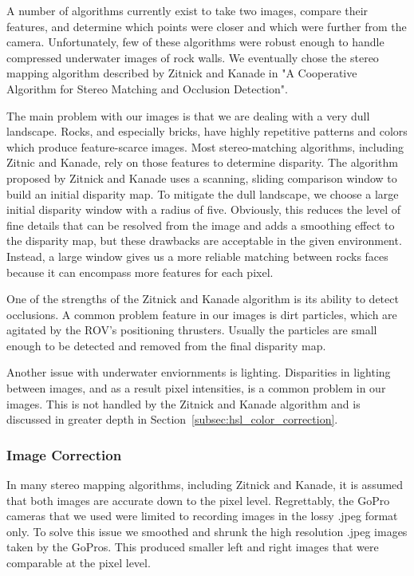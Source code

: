 \documentclass[a4paper,twoside]{article}
\begin{document}
A number of algorithms currently exist to take two images, compare their features, and determine which points were closer and which were further from the camera. 
Unfortunately, few of these algorithms were robust enough to handle compressed underwater images of rock walls.
We eventually chose the stereo mapping algorithm described by Zitnick and Kanade in "A Cooperative Algorithm for Stereo Matching and Occlusion Detection".

The main problem with our images is that we are dealing with a very dull landscape.  
Rocks, and especially bricks, have highly repetitive patterns and colors which produce feature-scarce images.
Most stereo-matching algorithms, including Zitnic and Kanade, rely on those features to determine disparity.  
The algorithm proposed by Zitnick and Kanade uses a scanning, sliding comparison window to build an initial disparity map.  
To mitigate the dull landscape, we choose a large initial disparity window with a radius of five. 
Obviously, this reduces the level of fine details that can be resolved from the image and adds a smoothing effect to the disparity map, but these drawbacks are acceptable in the given environment.  
Instead, a large window gives us a more reliable matching between rocks faces because it can encompass more features for each pixel.  

One of the strengths of the Zitnick and Kanade algorithm is its ability to detect occlusions.  
A common problem feature in our images is dirt particles, which are agitated by the ROV's positioning thrusters.
Usually the particles are small enough to be detected and removed from the final disparity map.

Another issue with underwater enviornments is lighting.
  Disparities in lighting between images, and as a result pixel intensities, is a common problem in our images.  
This is not handled by the Zitnick and Kanade algorithm and is discussed in greater depth in Section~\ref{subsec:hsl_color_correction}.


\subsubsection{Image Correction}
\label{subsec:image_correction}

In many stereo mapping algorithms, including Zitnick and Kanade, it is assumed that both images are accurate down to the pixel level.
Regrettably, the GoPro cameras that we used were limited to recording images in the lossy .jpeg format only.
To solve this issue we smoothed and shrunk the high resolution .jpeg images taken by the GoPros. 
This produced smaller left and right images that were comparable at the pixel level.
\end{document}
